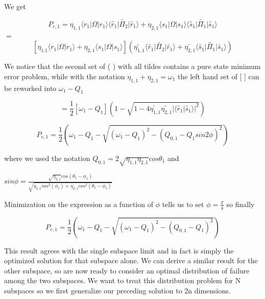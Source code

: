 \documentclass{beamer}
\begin{document}
\begin{frame}
We get

\[P_{e,1} = \eta_{1,1} \langle r_1 \vert \Omega \vert r_1 \rangle \langle \widetilde{r_1} \vert \widetilde{\Pi_2} \vert \widetilde{r_1} \rangle + \eta_{2,1} \langle s_1 \vert \Omega \vert s_1 \rangle \langle \widetilde{s_1} \vert \widetilde{\Pi_1} \vert \widetilde{s_1}\rangle \]
$=$
\[  [\eta_{1.1} \langle r_1 \vert \Omega \vert r_1 \rangle + \eta_{2,1}\langle s_1 \vert \Omega \vert s_1 \rangle](\widetilde{\eta_{1,1}}\langle\widetilde{r_1} \vert \widetilde{\Pi_2} \vert \widetilde{r_1} \rangle + \widetilde{\eta_{2,1}} \langle \widetilde{s_1} \vert \widetilde{\Pi_1} \vert \widetilde{s_1}\rangle )\]

We notice that the second set of ( ) with all tildes contains a pure state minimum error problem, while with the notation $ \eta_{1,1} +\eta_{2,1} = \omega_1$ the left hand set of [ ]  can be reworked into $\omega_1 - Q_1 $

\[ = \frac{1}{2} [\omega_1 - Q_1] (1- \sqrt{1 - 4 \widetilde{\eta_{1,1}} \widetilde{\eta_{2,1}} \vert \langle \widetilde{r_1} \vert \widetilde{s_1} \rangle \vert ^2 }) \] 
\end{frame}

\begin{frame}

\[P_{e,1} = \frac{1}{2} ( \omega_1 - Q_1 - \sqrt{ ( \omega_1 - Q_1)^2 -(Q_{0,1} - Q_1 sin 2 \phi )^2})\]

where we used the notation $Q_{0,1} = 2 \sqrt{\eta_{1,1}\eta_{2,1}} cos \theta_1$ and 

 $ sin \phi = \frac{ \sqrt {\eta_{2,1}} cos (\theta_1 - \phi_1)}{\sqrt{ \eta_{1,1} cos^2 (\phi_1)+ \eta_{2,1} cos^2 (\theta_1 - \phi_1)}}$

Minimization on the expression as a function of $\phi$ tells us to set $\phi =\frac{\pi}{4}$ so finally

\[P_{e,1} = \frac{1}{2} ( \omega_1 - Q_1 - \sqrt{ ( \omega_1 - Q_1)^2 -(Q_{0,1} - Q_1 )^2})\]
\end{frame}
\begin{frame}

This result agrees with the single subspace limit and in fact is simply the optimized solution for that subspace alone. We can derive a similar result for the other subspace, so are now ready to consider an optimal distribution of failure among the two subspaces.  We want to treat this distribution problem for N subspaces so we first generalize our preceding solution to 2n dimensions.
\end{frame}
\end{document}
